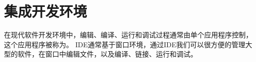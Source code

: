 \section{集成开发环境}
{
    在现代软件开发环境中，编辑、编译、运行和调试过程通常由单个应用程序控制，这个应用程序被称为。
    IDE通常基于窗口环境，通过IDE我们可以很方便的管理大型的软件，在窗口中编辑文件，以及编译、链接、运行和调试。
}

\endinput
